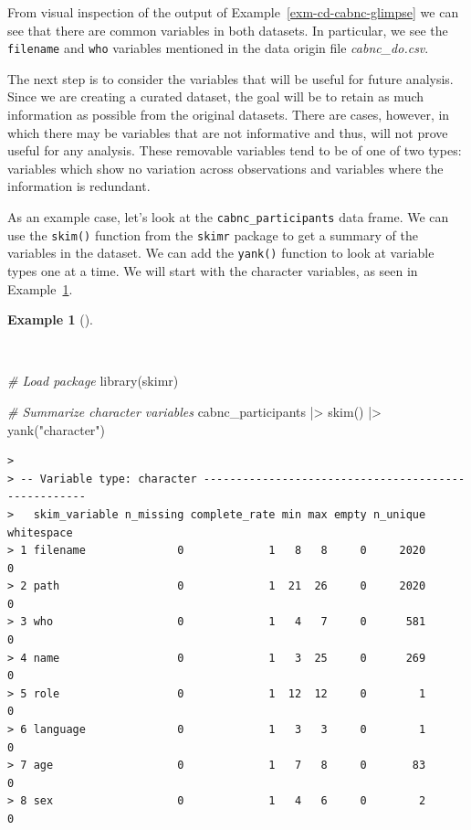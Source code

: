 \documentclass[
  letterpaper,
  DIV=11,
  numbers=noendperiod]{scrreprt}
\newenvironment{Shaded}{\begin{snugshade}}{\end{snugshade}}
\newcommand{\CommentTok}[1]{\textcolor[rgb]{0.00,0.00,0.00}{\textit{#1}}}
\newcommand{\FunctionTok}[1]{\textcolor[rgb]{0.00,0.00,0.00}{#1}}
\newcommand{\NormalTok}[1]{\textcolor[rgb]{0.00,0.00,0.00}{#1}}
\newcommand{\SpecialCharTok}[1]{\textcolor[rgb]{0.00,0.00,0.00}{#1}}
\newcommand{\StringTok}[1]{\textcolor[rgb]{0.00,0.00,0.00}{#1}}
\theoremstyle{definition}
\newtheorem{example}{Example}[chapter]
\theoremstyle{remark}
\begin{document}
From visual inspection of the output of
Example~\ref{exm-cd-cabnc-glimpse} we can see that there are common
variables in both datasets. In particular, we see the \texttt{filename}
and \texttt{who} variables mentioned in the data origin file
\emph{cabnc\_do.csv}.

The next step is to consider the variables that will be useful for
future analysis. Since we are creating a curated dataset, the goal will
be to retain as much information as possible from the original datasets.
There are cases, however, in which there may be variables that are not
informative and thus, will not prove useful for any analysis. These
removable variables tend to be of one of two types: variables which show
no variation across observations and variables where the information is
redundant.

As an example case, let's look at the \texttt{cabnc\_participants} data
frame. We can use the \texttt{skim()} function from the \texttt{skimr}
package to get a summary of the variables in the dataset. We can add the
\texttt{yank()} function to look at variable types one at a time. We
will start with the character variables, as seen in
Example~\ref{exm-cd-cabnc-skim-character}.

\begin{example}[]\protect\hypertarget{exm-cd-cabnc-skim-character}{}\label{exm-cd-cabnc-skim-character}

~

\begin{Shaded}
\begin{Highlighting}[]
\CommentTok{\# Load package}
\FunctionTok{library}\NormalTok{(skimr)}

\CommentTok{\# Summarize character variables}
\NormalTok{cabnc\_participants }\SpecialCharTok{|\textgreater{}}
  \FunctionTok{skim}\NormalTok{() }\SpecialCharTok{|\textgreater{}}
  \FunctionTok{yank}\NormalTok{(}\StringTok{"character"}\NormalTok{)}
\end{Highlighting}
\end{Shaded}

\begin{verbatim}
> 
> -- Variable type: character ----------------------------------------------------
>   skim_variable n_missing complete_rate min max empty n_unique whitespace
> 1 filename              0             1   8   8     0     2020          0
> 2 path                  0             1  21  26     0     2020          0
> 3 who                   0             1   4   7     0      581          0
> 4 name                  0             1   3  25     0      269          0
> 5 role                  0             1  12  12     0        1          0
> 6 language              0             1   3   3     0        1          0
> 7 age                   0             1   7   8     0       83          0
> 8 sex                   0             1   4   6     0        2          0
\end{verbatim}

\end{example}
\end{document}

